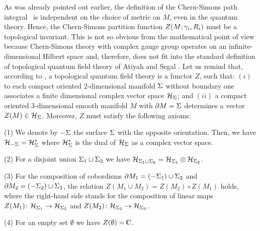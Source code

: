 

As was already pointed out earlier,
the definition of the Chern-Simons path integral \zwpathint\ is
independent on the choice of metric on $M$, even in the quantum theory.
Hence, the Chern-Simons partition function
$Z(M;\gamma_i, R_i)$ must be a topological invariant.
This is not so obvious from the mathematical point of view
because Chern-Simons theory with complex gauge group operates on
an infinite-dimensional Hilbert space and, therefore,
does not fit into the standard definition of topological
quantum field theory of Atiyah and Segal \Atiyah.
Let us remind that, according to \Atiyah,
a topological quantum field theory is a functor $Z$,
such that: $(i)$ to each compact oriented 2-dimensional manifold ${\Sigma}$
without boundary one associates a finite dimensional complex vector
space ${\cal H}_{{\Sigma}}$; and $(ii)$ a compact oriented 3-dimensional smooth
manifold $M$ with $\partial M = {\Sigma}$ determines a vector $Z(M) \in {\cal H}_{{\Sigma}}$.
Moreover, $Z$ must satisfy the following axioms:

\item{(1)} 
We denote by $-{\Sigma}$ the surface ${\Sigma}$ with the opposite orientation.
Then, we have ${\cal H}_{-{\Sigma}} = {\cal H}_{{\Sigma}}^*$ where ${\cal H}_{{\Sigma}}^*$ is the dual
of ${\cal H}_{{\Sigma}}$ as a complex vector space.

\item{(2)}
For a disjoint union ${\Sigma}_1 \sqcup {\Sigma}_2$ we have
${\cal H}_{{\Sigma}_1 \sqcup {\Sigma}_2} = {\cal H}_{{\Sigma}_1} \otimes {\cal H}_{{\Sigma}_2}$.

\item{(3)}
For the composition of cobordisms
$\partial M_1 = (-{\Sigma}_1) \sqcup {\Sigma}_2$
and $\partial M_2 = (-{\Sigma}_2) \sqcup {\Sigma}_3$, the relation
$Z (M_1 \cup M_2) = Z (M_2) \circ Z(M_1)$
holds, where the right-hand side stands for the composition
of linear maps $Z(M_1) \colon {\cal H}_{{\Sigma}_1} \to {\cal H}_{{\Sigma}_2}$
and $Z(M_2) \colon {\cal H}_{{\Sigma}_2} \to {\cal H}_{{\Sigma}_3}$.

\item{(4)}
For an empty set $\emptyset$ we have $Z (\emptyset) = \IC$.

